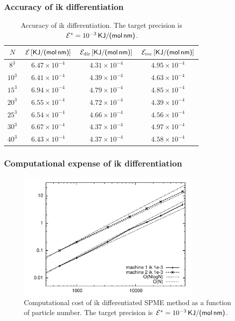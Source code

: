 \documentclass{beamer}
\begin{document}
\begin{frame}
  \frametitle{Accuracy of ik differentiation}
\begin{table}
  \centering
  \begin{tabular*}{0.95\textwidth}{@{\extracolsep{\fill}}cccc}
    $N$ & $\mathcal E\,[\textsf{KJ/(mol\,nm)}]$ & $\mathcal E_{\textrm{dir}}\,[\textsf{KJ/(mol\,nm)}]$ & $\mathcal E_{\textrm{rec}}\,[\textsf{KJ/(mol\,nm)}]$ \\ \hline
    $8^3$ & $6.47\times10^{-4}$ & $4.31\times10^{-4}$ & $4.95\times10^{-4}$   \\
    $10^3$ & $6.41\times10^{-4}$ & $4.39\times10^{-4}$ & $4.63\times10^{-4}$   \\
    $15^3$ & $6.94\times10^{-4}$ & $4.79\times10^{-4}$ & $4.85\times10^{-4}$   \\
    $20^3$ & $6.55\times10^{-4}$ & $4.72\times10^{-4}$ & $4.39\times10^{-4}$   \\
    $25^3$ & $6.54\times10^{-4}$ & $4.66\times10^{-4}$ & $4.56\times10^{-4}$   \\
    $30^3$ & $6.67\times10^{-4}$ & $4.37\times10^{-4}$ & $4.97\times10^{-4}$   \\
    $40^3$ & $6.43\times10^{-4}$ & $4.37\times10^{-4}$ & $4.58\times10^{-4}$   
  \end{tabular*}
  \caption{
    Accuracy of ik differentiation. 
    The target precision is $\mathcal E^\ast=10^{-3}\,\textsf{KJ/(mol\,nm)}$.
  }
\end{table}
\end{frame}

\begin{frame}
  \frametitle{Computational expense of ik differentiation}
\begin{figure}
  \includegraphics[width=0.8\textwidth]{figs/long-range//both-time-1e-3.pdf}
  \caption{Computational cost of ik differentiated SPME method as a
    function of particle number. The target precision is
    $\mathcal E^\ast=10^{-3}\,\textsf{KJ/(mol\,nm)}$.}
\end{figure}
\end{frame}
\end{document}
